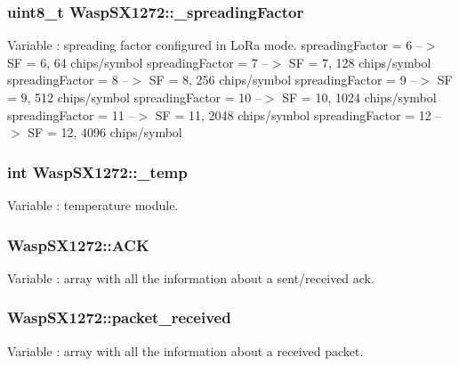 \subsubsection[{\texorpdfstring{\+\_\+spreading\+Factor}{_spreadingFactor}}]{\setlength{\rightskip}{0pt plus 5cm}uint8\+\_\+t Wasp\+S\+X1272\+::\+\_\+spreading\+Factor}\hypertarget{class_wasp_s_x1272_a501d372a9d25177f2de1015279efa842}{}\label{class_wasp_s_x1272_a501d372a9d25177f2de1015279efa842}
Variable \+: spreading factor configured in Lo\+Ra mode. spreading\+Factor = 6 --$>$ SF = 6, 64 chips/symbol spreading\+Factor = 7 --$>$ SF = 7, 128 chips/symbol spreading\+Factor = 8 --$>$ SF = 8, 256 chips/symbol spreading\+Factor = 9 --$>$ SF = 9, 512 chips/symbol spreading\+Factor = 10 --$>$ SF = 10, 1024 chips/symbol spreading\+Factor = 11 --$>$ SF = 11, 2048 chips/symbol spreading\+Factor = 12 --$>$ SF = 12, 4096 chips/symbol 
\subsubsection[{\texorpdfstring{\+\_\+temp}{_temp}}]{\setlength{\rightskip}{0pt plus 5cm}int Wasp\+S\+X1272\+::\+\_\+temp}\hypertarget{class_wasp_s_x1272_ab9473d933d186b09be966fe005be1391}{}\label{class_wasp_s_x1272_ab9473d933d186b09be966fe005be1391}
Variable \+: temperature module. 
\subsubsection[{\texorpdfstring{A\+CK}{ACK}}]{ Wasp\+S\+X1272\+::\+A\+CK}\hypertarget{class_wasp_s_x1272_ad87e372f185c7c5fd312dd8323d91c95}{}\label{class_wasp_s_x1272_ad87e372f185c7c5fd312dd8323d91c95}
Variable \+: array with all the information about a sent/received ack. 
\subsubsection[{\texorpdfstring{packet\+\_\+received}{packet_received}}]{ Wasp\+S\+X1272\+::packet\+\_\+received}\hypertarget{class_wasp_s_x1272_a43eb11f317cfd60607e2d00a5515f5d7}{}\label{class_wasp_s_x1272_a43eb11f317cfd60607e2d00a5515f5d7}
Variable \+: array with all the information about a received packet. 
